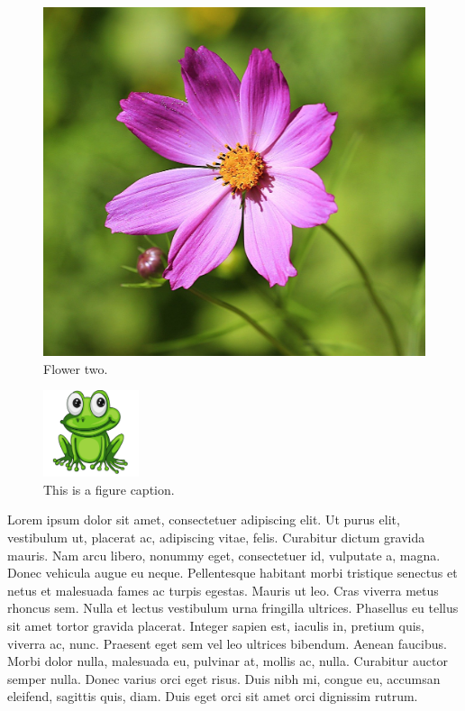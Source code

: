 \documentclass{article}
\begin{document}
\begin{figure}[t!]
\begin{minipage}[b]{0.4\textwidth}
    \includegraphics[width=\textwidth]{images/flower2.jpg}
    \caption{Flower two.}
  \end{minipage}
\end{figure}

% 
\begin{figure}
\centering
\renewcommand{\figurename}{Fig.}
\includegraphics[width=0.25\textwidth]{images/frog.jpg}
\caption{\label{fig:frog1}This is a figure caption.}
\end{figure}

Lorem ipsum dolor sit amet, consectetuer adipiscing elit. Ut purus elit, vestibulum ut, placerat ac, adipiscing vitae, 
felis. Curabitur dictum gravida mauris. Nam arcu libero, nonummy eget, consectetuer id, vulputate a, magna. Donec vehicula augue eu neque. Pellentesque habitant morbi tristique senectus et netus et malesuada fames ac turpis egestas. Mauris ut leo. Cras viverra metus rhoncus sem. Nulla et lectus vestibulum urna fringilla ultrices.  Phasellus eu tellus sit amet tortor gravida placerat. Integer sapien est, iaculis in, pretium quis, viverra ac, nunc. Praesent eget sem vel leo ultrices bibendum. Aenean faucibus.
Morbi dolor nulla, malesuada eu, pulvinar at, mollis ac, nulla. Curabitur auctor semper nulla. Donec varius orci eget risus. Duis nibh mi, congue eu, accumsan eleifend, sagittis quis, diam. Duis eget orci sit amet orci dignissim rutrum.
\end{document}
